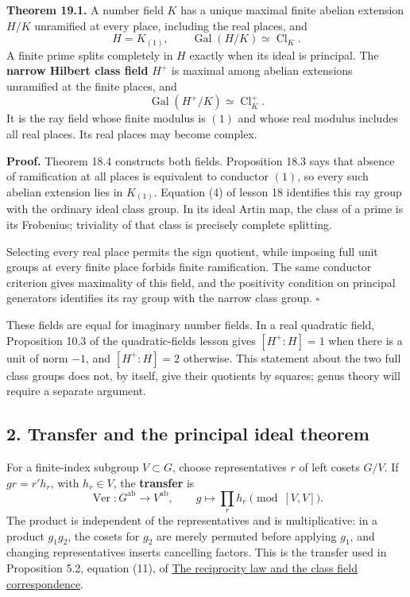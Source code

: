 \documentclass[11pt,a4paper]{article}
\begin{document}
\textbf{Theorem 19.1.} A number field \(K\) has a unique maximal finite
abelian extension \(H/K\) unramified at every place, including the real
places, and \[
H=K_{(1)},\qquad
\operatorname{Gal}(H/K)\simeq\operatorname{Cl}_K.
\tag{1}
\] A finite prime splits completely in \(H\) exactly when its ideal is
principal. The \textbf{narrow Hilbert class field} \(H^+\) is maximal
among abelian extensions unramified at the finite places, and \[
\operatorname{Gal}(H^+/K)\simeq\operatorname{Cl}_K^+.
\tag{2}
\] It is the ray field whose finite modulus is \((1)\) and whose real
modulus includes all real places. Its real places may become complex.

\textbf{Proof.} Theorem 18.4 constructs both fields. Proposition 18.3
says that absence of ramification at all places is equivalent to
conductor \((1)\), so every such abelian extension lies in \(K_{(1)}\).
Equation (4) of lesson 18 identifies this ray group with the ordinary
ideal class group. In its ideal Artin map, the class of a prime is its
Frobenius; triviality of that class is precisely complete splitting.

Selecting every real place permits the sign quotient, while imposing
full unit groups at every finite place forbids finite ramification. The
same conductor criterion gives maximality of this field, and the
positivity condition on principal generators identifies its ray group
with the narrow class group. \(\square\)

These fields are equal for imaginary number fields. In a real quadratic
field, Proposition 10.3 of the quadratic-fields lesson gives
\([H^+:H]=1\) when there is a unit of norm \(-1\), and \([H^+:H]=2\)
otherwise. This statement about the two full class groups does not, by
itself, give their quotients by squares; genus theory will require a
separate argument.

\subsection{2. Transfer and the principal ideal
theorem}\label{transfer-and-the-principal-ideal-theorem}

For a finite-index subgroup \(V\subset G\), choose representatives \(r\)
of left cosets \(G/V\). If \(gr=r'h_r\), with \(h_r\in V\), the
\textbf{transfer} is \[
\operatorname{Ver}:G^{\mathrm{ab}}\longrightarrow V^{\mathrm{ab}},
\qquad g\longmapsto\prod_r h_r\pmod{[V,V]}.
\tag{3}
\] The product is independent of the representatives and is
multiplicative: in a product \(g_1g_2\), the cosets for \(g_2\) are
merely permuted before applying \(g_1\), and changing representatives
inserts cancelling factors. This is the transfer used in Proposition
5.2, equation (11), of
\href{../the-reciprocity-law-and-the-class-field-correspondence.html}{The
reciprocity law and the class field correspondence}.
\end{document}
